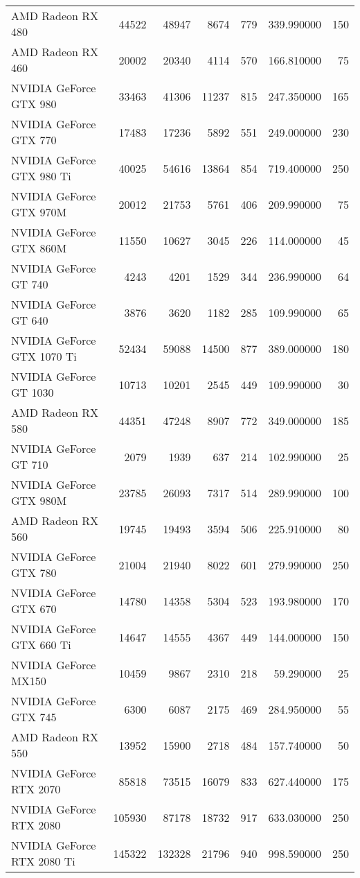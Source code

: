 \begin{longtable}{lrrrrrr}
AMD Radeon RX 480 & 44522 & 48947 & 8674 & 779 & 339.990000 & 150 \\
AMD Radeon RX 460 & 20002 & 20340 & 4114 & 570 & 166.810000 & 75 \\
NVIDIA GeForce GTX 980 & 33463 & 41306 & 11237 & 815 & 247.350000 & 165 \\
NVIDIA GeForce GTX 770 & 17483 & 17236 & 5892 & 551 & 249.000000 & 230 \\
NVIDIA GeForce GTX 980 Ti & 40025 & 54616 & 13864 & 854 & 719.400000 & 250 \\
NVIDIA GeForce GTX 970M & 20012 & 21753 & 5761 & 406 & 209.990000 & 75 \\
NVIDIA GeForce GTX 860M & 11550 & 10627 & 3045 & 226 & 114.000000 & 45 \\
NVIDIA GeForce GT 740 & 4243 & 4201 & 1529 & 344 & 236.990000 & 64 \\
NVIDIA GeForce GT 640 & 3876 & 3620 & 1182 & 285 & 109.990000 & 65 \\
NVIDIA GeForce GTX 1070 Ti & 52434 & 59088 & 14500 & 877 & 389.000000 & 180 \\
NVIDIA GeForce GT 1030 & 10713 & 10201 & 2545 & 449 & 109.990000 & 30 \\
AMD Radeon RX 580 & 44351 & 47248 & 8907 & 772 & 349.000000 & 185 \\
NVIDIA GeForce GT 710 & 2079 & 1939 & 637 & 214 & 102.990000 & 25 \\
NVIDIA GeForce GTX 980M & 23785 & 26093 & 7317 & 514 & 289.990000 & 100 \\
AMD Radeon RX 560 & 19745 & 19493 & 3594 & 506 & 225.910000 & 80 \\
NVIDIA GeForce GTX 780 & 21004 & 21940 & 8022 & 601 & 279.990000 & 250 \\
NVIDIA GeForce GTX 670 & 14780 & 14358 & 5304 & 523 & 193.980000 & 170 \\
NVIDIA GeForce GTX 660 Ti & 14647 & 14555 & 4367 & 449 & 144.000000 & 150 \\
NVIDIA GeForce MX150 & 10459 & 9867 & 2310 & 218 & 59.290000 & 25 \\
NVIDIA GeForce GTX 745 & 6300 & 6087 & 2175 & 469 & 284.950000 & 55 \\
AMD Radeon RX 550 & 13952 & 15900 & 2718 & 484 & 157.740000 & 50 \\
NVIDIA GeForce RTX 2070 & 85818 & 73515 & 16079 & 833 & 627.440000 & 175 \\
NVIDIA GeForce RTX 2080 & 105930 & 87178 & 18732 & 917 & 633.030000 & 250 \\
NVIDIA GeForce RTX 2080 Ti & 145322 & 132328 & 21796 & 940 & 998.590000 & 250 \\

\end{longtable}
